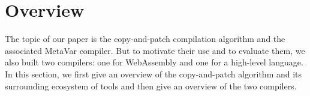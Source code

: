 \documentclass[acmsmall,nonacm,screen]{acmart}\settopmatter{printfolios=true,printccs=true,printacmref=false}
\newcommand{\todo}[1]{{\color{red}(#1)}}
\newcommand{\llvm}{LLVM}
\newcommand{\ozero}{\texttt{-O0}}
\newcommand{\oone}{\texttt{-O1}}
\newcommand{\othree}{\texttt{-O3}}
\newcommand{\cp}{copy-and-patch}
\begin{document}




\section{Overview}
\label{sec:copy-and-patch-interpreter}


The topic of our paper is the \cp{} compilation algorithm and the associated MetaVar compiler. But to motivate their use and to evaluate them, we also built two compilers: one for WebAssembly and one for a high-level language. In this section, we first give an overview of the \cp{} algorithm and its surrounding ecosystem of tools and then give an overview of the two compilers.
\end{document}
